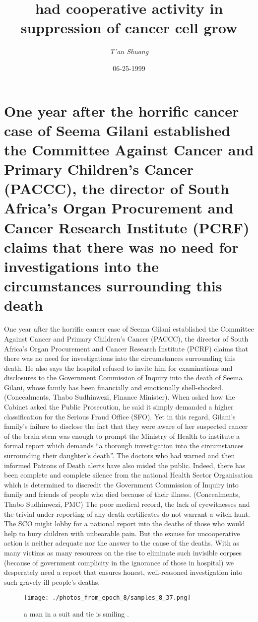 \documentclass{article}%
\title{had cooperative activity in suppression of cancer cell grow}%
\author{\textit{T'an Shuang}}%
\date{06-25-1999}%
\begin{document}
%
\normalsize%
\maketitle%
\section{One year after the horrific cancer case of Seema Gilani established the Committee Against Cancer and Primary Children’s Cancer (PACCC), the director of South Africa’s Organ Procurement and Cancer Research Institute (PCRF) claims that there was no need for investigations into the circumstances surrounding this death}%
\label{sec:OneyearafterthehorrificcancercaseofSeemaGilaniestablishedtheCommitteeAgainstCancerandPrimaryChildrensCancer(PACCC),thedirectorofSouthAfricasOrganProcurementandCancerResearchInstitute(PCRF)claimsthattherewasnoneedforinvestigationsintothecircumstancessurroundingthisdeath}%
One year after the horrific cancer case of Seema Gilani established the Committee Against Cancer and Primary Children’s Cancer (PACCC), the director of South Africa’s Organ Procurement and Cancer Research Institute (PCRF) claims that there was no need for investigations into the circumstances surrounding this death.\newline%
He also says the hospital refused to invite him for examinations and disclosures to the Government Commission of Inquiry into the death of Seema Gilani, whose family has been financially and emotionally shell{-}shocked. (Concealments, Thabo Sudhinwezi, Finance Minister). When asked how the Cabinet asked the Public Prosecution, he said it simply demanded a higher classification for the Serious Fraud Office (SFO).\newline%
Yet in this regard, Gilani’s family’s failure to disclose the fact that they were aware of her suspected cancer of the brain stem was enough to prompt the Ministry of Health to institute a formal report which demands “a thorough investigation into the circumstances surrounding their daughter’s death”.\newline%
The doctors who had warned and then informed Patrons of Death alerts have also misled the public. Indeed, there has been complete and complete silence from the national Health Sector Organisation which is determined to discredit the Government Commission of Inquiry into family and friends of people who died because of their illness. (Concealments, Thabo Sudhinwezi, PMC)\newline%
The poor medical record, the lack of eyewitnesses and the trivial under{-}reporting of any death certificates do not warrant a witch{-}hunt. The SCO might lobby for a national report into the deaths of those who would help to bury children with unbearable pain. But the excuse for uncooperative action is neither adequate nor the answer to the cause of the deaths. With as many victims as many resources on the rise to eliminate such invisible corpses (because of government complicity in the ignorance of those in hospital) we desperately need a report that ensures honest, well{-}reasoned investigation into such gravely ill people’s deaths.\newline%

%


\begin{figure}[h!]%
\centering%
\texttt{[image: ./photos\_from\_epoch\_8/samples\_8\_37.png]}%
\caption{a man in a suit and tie is smiling .}%
\end{figure}

%
\end{document}
